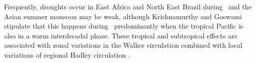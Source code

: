 Frequently, droughts occur in East Africa and North East Brazil during
\elnino\ and the Asian summer monsoon may be weak, although
Krishnamurthy and Goswami \cite{KG00} stipulate that this happens
during \elnino\ predominantly when the tropical Pacific is also in a
warm interdecadal phase. These tropical and subtropical effects are
associated with zonal variations in the Walker circulation combined
with local variations of regional Hadley circulation \cite{KG00}.



